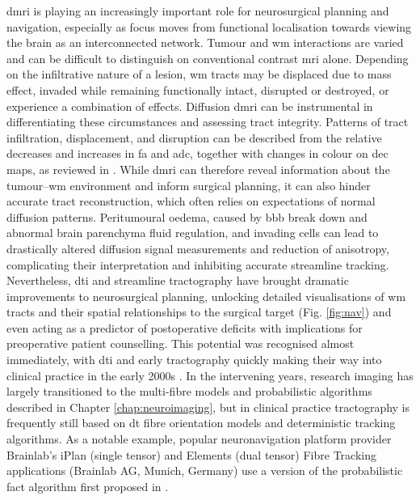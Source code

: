 \Gls{dmri} is playing an increasingly important role for neurosurgical planning and navigation\autocite{Manan2022}, especially as focus moves from functional localisation towards viewing the brain as an interconnected network.
Tumour and \gls{wm} interactions are varied and can be difficult to distinguish on conventional contrast \gls{mri} alone.
Depending on the infiltrative nature of a lesion, \gls{wm} tracts may be displaced due to mass effect, invaded while remaining functionally intact, disrupted or destroyed, or experience a combination of effects\autocite{Essayed2017,DSouza2019,Manan2023}.
Diffusion \gls{dmri} can be instrumental in differentiating these circumstances and assessing tract integrity\autocite{Field2004,Manan2023}.
Patterns of tract infiltration, displacement, and disruption can be described from the relative decreases and increases in \gls{fa} and \gls{adc}, together with changes in colour on \gls{dec} maps, as reviewed in \textcite{Manan2023}.
While \gls{dmri} can therefore reveal information about the tumour--\gls{wm} environment and inform surgical planning, it can also hinder accurate tract reconstruction, which often relies on expectations of normal diffusion patterns.
Peritumoural oedema, caused by \gls{bbb} break down and abnormal brain parenchyma fluid regulation\autocite{Ohmura2023}, and invading cells can lead to drastically altered diffusion signal measurements and reduction of anisotropy, complicating their interpretation and inhibiting accurate streamline tracking\autocite{Bulakbas2009,Nimsky2010,Kuhnt2013}.
Nevertheless, \gls{dti} and streamline tractography have brought dramatic improvements to neurosurgical planning, unlocking detailed visualisations of \gls{wm} tracts and their spatial relationships to the surgical target (Fig. \ref{fig:nav}) and even acting as a predictor of postoperative deficits with implications for preoperative patient counselling\autocite{Manan2022}.
This potential was recognised almost immediately, with \gls{dti} and early tractography quickly making their way into clinical practice in the early 2000s \autocite{Lee2001,Mori2002a,Nimsky2005}.
In the intervening years, research imaging has largely transitioned to the multi-fibre models and probabilistic algorithms described in Chapter \ref{chap:neuroimaging}, but in clinical practice tractography is frequently still based on \gls{dt} fibre orientation models \autocite{Toescu2020, Yang2021} and deterministic tracking algorithms.
As a notable example, popular neuronavigation platform provider Brainlab's iPlan\textregistered{} (single tensor)\autocite{Brainlab2012} and Elements (dual tensor)\autocite{Sollmann2020a} Fibre Tracking applications (Brainlab AG, Munich, Germany) use a version of the probabilistic \gls{fact} algorithm first proposed in \citeyear{Mori1999} \autocite{Mori1999}.


